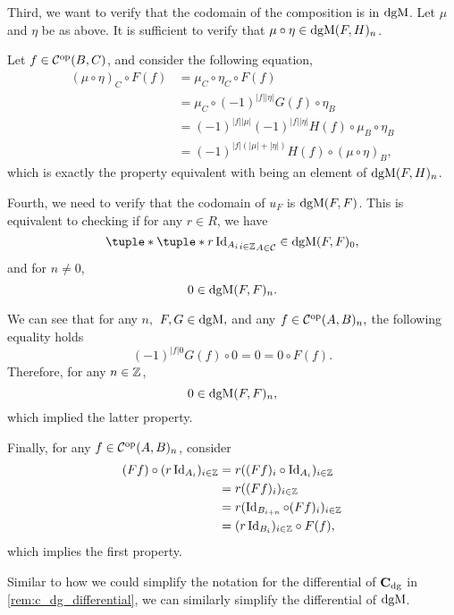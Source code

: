 \begin{remark}
    Third, we want to verify that the codomain of the composition is in \( \operatorname{dgM} \). Let \( \mu \) and \( \eta \) be as above. It is sufficient to verify that \( \mu \circ \eta \in \operatorname{dgM}(F, H)_n \).

    Let \( f \in {\mathcal{C}}^{\operatorname{op}}(B, C) \), and consider the following equation,
    \begin{align*}
        (\mu \circ \eta)_{C} \circ F(f) &= \mu_{C} \circ \eta_{C} \circ F(f) \\
        &= \mu_{C} \circ (-1)^{|f||\eta|} G(f) \circ \eta_{B} \\
        &= (-1)^{|f||\mu|}(-1)^{|f||\eta|} H(f) \circ \mu_{B} \circ \eta_{B} \\
        &= (-1)^{|f|(|\mu| + |\eta|)} H(f) \circ (\mu \circ \eta)_{B},
    \end{align*}
    which is exactly the property equivalent with being an element of \( \operatorname{dgM}(F, H)_n \).

    Fourth, we need to verify that the codomain of \( u_F \) is \( \operatorname{dgM}(F, F) \). This is equivalent to checking if for any \( r \in R \), we have
    \[
        \tuple*{ \tuple*{ r \Id_{A_i} }_{i \in \Zb} }_{A \in \Cc} \in \dgM(F, F)_0,
    \]
    and for \( n \neq 0 \),
    \[
        0 \in \operatorname{dgM}(F, F)_n.
    \]

    We can see that for any \( n, \) \( F, G \in \operatorname{dgM}, \) and any \( f \in {\mathcal{C}}^{\operatorname{op}}(A, B)_n, \) the following equality holds
    \[
        (-1)^{|f|0}G(f) \circ 0 = 0 = 0 \circ F(f).
    \]
    Therefore, for any \( n \in {\mathbb{Z}} \),
    \[
        0 \in \operatorname{dgM}(F, F)_n,
    \]
    which implied the latter property.

    Finally, for any \( f \in {\mathcal{C}}^{\operatorname{op}}(A, B)_n \), consider
    \begin{align*}
        (F f) \circ (r \operatorname{Id}_{A_i})_{i \in {\mathbb{Z}}} &= r ((F f)_i \circ \operatorname{Id}_{A_i})_{i \in {\mathbb{Z}}} \\
        &= r ((F f)_i)_{i \in {\mathbb{Z}}} \\
        &= r (\operatorname{Id}_{B_{i + n}} \circ (F f)_i)_{i \in {\mathbb{Z}}} \\
        &= (r \operatorname{Id}_{B_i})_{i \in {\mathbb{Z}}} \circ F(f),
    \end{align*}
    which implies the first property.
\end{remark}

Similar to how we could simplify the notation for the differential of \( \operatorname{\mathbf{C}}_{\operatorname{dg}} \) in \autoref{rem:c_dg_differential}, we can similarly simplify the differential of \( \operatorname{dgM} \).

